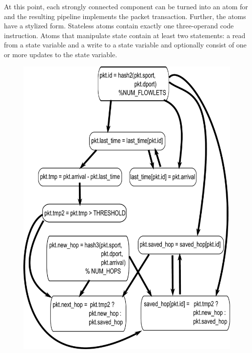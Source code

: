 At this point, each strongly connected component can be turned into an atom for
\absmachine and the resulting pipeline implements the packet transaction.
Further, the atoms have a stylized form. Stateless atoms contain exactly
one three-operand code instruction. Atoms that manipulate state contain at
least two statements: a read from a state variable and a write to a state
variable and optionally consist of one or more updates to the state variable.

\begin{figure}[!t]
\begin{minipage}{0.5\textwidth}
  \includegraphics[width=\columnwidth]{deps.pdf}
\end{minipage}
%
\vrule\quad
%
\begin{minipage}{0.5\textwidth}

\end{minipage}
\end{figure}
